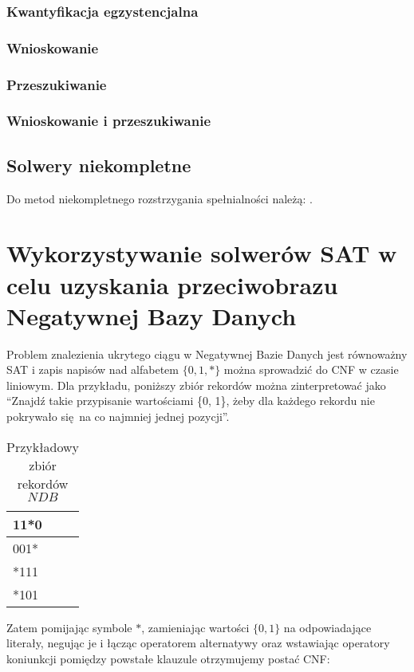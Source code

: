 \subsubsection{Kwantyfikacja egzystencjalna}
\subsubsection{Wnioskowanie}
\subsubsection{Przeszukiwanie}
\subsubsection{Wnioskowanie i przeszukiwanie}
\subsection{Solwery niekompletne}
Do metod niekompletnego rozstrzygania spełnialności należą:  \cite{handbook-satifiability-incomplete}. 

\section{Wykorzystywanie solwerów SAT w celu uzyskania przeciwobrazu Negatywnej Bazy Danych}

Problem znalezienia ukrytego ciągu w Negatywnej Bazie Danych jest równoważny SAT i zapis napisów nad alfabetem 
$\{0, 1, *\}$ można sprowadzić do CNF w czasie liniowym.
 Dla przykładu, poniższy zbiór rekordów można zinterpretować jako 
 \enquote{Znajdź takie przypisanie wartościami \{0, 1\}, żeby dla każdego rekordu nie pokrywało się na co najmniej jednej pozycji}.
 
\begin{table}[h]

    \centering
    \label{Tbl:NDB-sat-example}
    \begin{tabular}{|l|}
    	\hline
    	11*0 \\ \hline
    	001* \\ \hline
    	*111 \\ \hline
    	*101 \\ \hline
    \end{tabular}
    \caption{Przykładowy zbiór rekordów $NDB$}
\end{table}

Zatem pomijając symbole $*$, zamieniając wartości $\{0,1\}$ na odpowiadające literały, negując je i łącząc operatorem alternatywy
oraz wstawiając operatory koniunkcji pomiędzy powstałe klauzule otrzymujemy postać CNF:

